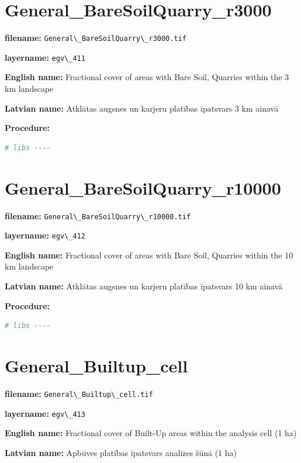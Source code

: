 \documentclass[
]{book}
\newcommand{\passthrough}[1]{#1}
\begin{document}
\section{General\_BareSoilQuarry\_r3000}\label{ch06.411}

\textbf{filename:} \passthrough{\lstinline!General\_BareSoilQuarry\_r3000.tif!}

\textbf{layername:} \passthrough{\lstinline!egv\_411!}

\textbf{English name:} Fractional cover of areas with Bare Soil, Quarries within the 3 km landscape

\textbf{Latvian name:} Atklātas augsnes un karjeru platības īpatsvars 3 km ainavā

\textbf{Procedure:}

\begin{lstlisting}[language=R]
# libs ----
\end{lstlisting}

\section{General\_BareSoilQuarry\_r10000}\label{ch06.412}

\textbf{filename:} \passthrough{\lstinline!General\_BareSoilQuarry\_r10000.tif!}

\textbf{layername:} \passthrough{\lstinline!egv\_412!}

\textbf{English name:} Fractional cover of areas with Bare Soil, Quarries within the 10 km landscape

\textbf{Latvian name:} Atklātas augsnes un karjeru platības īpatsvars 10 km ainavā

\textbf{Procedure:}

\begin{lstlisting}[language=R]
# libs ----
\end{lstlisting}

\section{General\_Builtup\_cell}\label{ch06.413}

\textbf{filename:} \passthrough{\lstinline!General\_Builtup\_cell.tif!}

\textbf{layername:} \passthrough{\lstinline!egv\_413!}

\textbf{English name:} Fractional cover of Built-Up areas within the analysis cell (1 ha)

\textbf{Latvian name:} Apbūves platības īpatsvars analīzes šūnā (1 ha)
\end{document}
